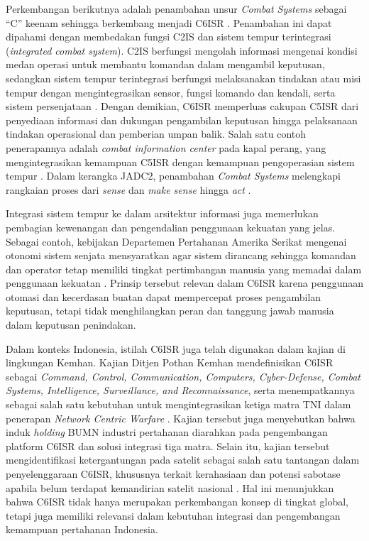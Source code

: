 Perkembangan berikutnya adalah penambahan unsur \textit{Combat Systems} sebagai ``C'' keenam sehingga berkembang menjadi C6ISR \parencite{Petrovski2023,Todorovic2025}.
Penambahan ini dapat dipahami dengan membedakan fungsi C2IS dan sistem tempur terintegrasi (\textit{integrated combat system}).
C2IS berfungsi mengolah informasi mengenai kondisi medan operasi untuk membantu komandan dalam mengambil keputusan, sedangkan sistem tempur terintegrasi berfungsi melaksanakan tindakan atau misi tempur dengan mengintegrasikan sensor, fungsi komando dan kendali, serta sistem persenjataan \parencite{Todorovic2025}.
Dengan demikian, C6ISR memperluas cakupan C5ISR dari penyediaan informasi dan dukungan pengambilan keputusan hingga pelaksanaan tindakan operasional dan pemberian umpan balik.
Salah satu contoh penerapannya adalah \textit{combat information center} pada kapal perang, yang mengintegrasikan kemampuan C5ISR dengan kemampuan pengoperasian sistem tempur \parencite{Petrovski2023}.
Dalam kerangka JADC2, penambahan \textit{Combat Systems} melengkapi rangkaian proses dari \textit{sense} dan \textit{make sense} hingga \textit{act} \parencite{USDoD2022}.

Integrasi sistem tempur ke dalam arsitektur informasi juga memerlukan pembagian kewenangan dan pengendalian penggunaan kekuatan yang jelas.
Sebagai contoh, kebijakan Departemen Pertahanan Amerika Serikat mengenai otonomi sistem senjata mensyaratkan agar sistem dirancang sehingga komandan dan operator tetap memiliki tingkat pertimbangan manusia yang memadai dalam penggunaan kekuatan \parencite{DoDD300009}.
Prinsip tersebut relevan dalam C6ISR karena penggunaan otomasi dan kecerdasan buatan dapat mempercepat proses pengambilan keputusan, tetapi tidak menghilangkan peran dan tanggung jawab manusia dalam keputusan penindakan.

Dalam konteks Indonesia, istilah C6ISR juga telah digunakan dalam kajian di lingkungan Kemhan.
Kajian Ditjen Pothan Kemhan mendefinisikan C6ISR sebagai \textit{Command, Control, Communication, Computers, Cyber-Defense, Combat Systems, Intelligence, Surveillance, and Reconnaissance}, serta menempatkannya sebagai salah satu kebutuhan untuk mengintegrasikan ketiga matra TNI dalam penerapan \textit{Network Centric Warfare} \parencite{Dwipratama2023}.
Kajian tersebut juga menyebutkan bahwa induk \textit{holding} BUMN industri pertahanan diarahkan pada pengembangan platform C6ISR dan solusi integrasi tiga matra.
Selain itu, kajian tersebut mengidentifikasi ketergantungan pada satelit sebagai salah satu tantangan dalam penyelenggaraan C6ISR, khususnya terkait kerahasiaan dan potensi sabotase apabila belum terdapat kemandirian satelit nasional \parencite{Dwipratama2023}.
Hal ini menunjukkan bahwa C6ISR tidak hanya merupakan perkembangan konsep di tingkat global, tetapi juga memiliki relevansi dalam kebutuhan integrasi dan pengembangan kemampuan pertahanan Indonesia.

